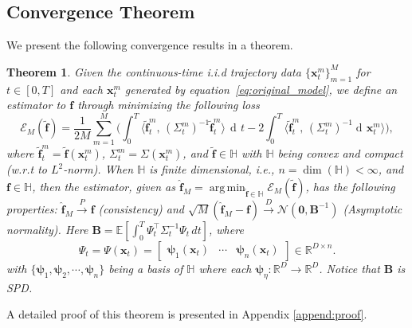 \documentclass[11pt]{article} %
\def\eqref#1{equation~\ref{#1}}
\def\rvx{{\mathbf{x}}}
\def\vzero{{\bm{0}}}
\def\vf{{\bm{f}}}
\def\mB{{\bm{B}}}
\def\sH{{\mathbb{H}}}
\newcommand{\E}{\mathbb{E}}
\newcommand{\R}{\mathbb{R}}
\DeclareMathOperator*{\argmin}{arg\,min}
\DeclareMathOperator{\dif}{d \!}        %
\newcommand{\dt}{\dif t}
\newcommand{\psivec}{\bm\psi}
\newcommand{\inp}[1]{\langle #1 \rangle}
\newcommand{\loss}{\mathcal{E}}
\newcommand{\normal}{\mathcal{N}}
\newtheorem{theorem}{Theorem}
\begin{document}
\subsection{Convergence Theorem}
%
We present the following convergence results in a theorem.
\begin{theorem}
Given the continuous-time i.i.d trajectory data $\{\rvx^m_t\}_{m = 1}^M$ for $t \in [0, T]$ and each $\rvx_t^m$ generated by \eqref{eq:original_model}, we define an estimator to $\vf$ through minimizing the following loss
\[
\loss_M(\tilde\vf) = \frac{1}{2M}\sum_{m = 1}^M\big(\int_0^T\inp{\tilde\vf_t^m, \,(\Sigma^m_t)^{-1}\tilde\vf_t^m} \, \dt - 2\int_0^T\inp{\tilde\vf_t^m, \,(\Sigma^m_t)^{-1}\dif\rvx_t^m}\big),
\]
where $\tilde\vf_t^m = \tilde\vf(\rvx_t^m)$, $\Sigma_t^m = \Sigma(\rvx_t^m)$, and $\tilde\vf \in \sH$ with $\sH$ being convex and compact (w.r.t to $L^2$-norm).  When $\sH$ is finite dimensional, i.e., $n = \dim(\sH) < \infty$, and $\vf \in \sH$, then the estimator, given as $\hat\vf_{M} = \argmin_{\tilde\vf \in \sH}\loss_M(\tilde\vf)$, has the following properties: $\hat\vf_M \xrightarrow{P} \vf$ (consistency) and $\sqrt{M}(\hat\vf_M - \vf) \xrightarrow{D} \normal(\vzero, \mB^{-1})$ (Asymptotic normality). Here $\mB = \E[\int_0^T\Psi_t^\intercal\Sigma_t^{-1}\Psi_t \, dt]$, where 
\[
\Psi_t = \Psi(\rvx_t) = \begin{bmatrix} \psivec_1(\rvx_t) & \cdots & \psivec_n(\rvx_t) \end{bmatrix} \in \R^{D \times n}.
\]
with $\{\psivec_1, \psivec_2, \cdots, \psivec_n\}$ being a basis of $\sH$ where each $\psivec_{\eta}: \R^D \rightarrow \R^D$.  Notice that $\mB$ is SPD. 
\end{theorem}
A detailed proof of this theorem is presented in Appendix \ref{append:proof}.
%
\end{document}
